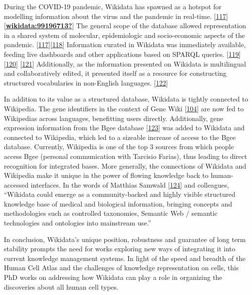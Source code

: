 During the COVID-19 pandemic, Wikidata has spawned as a hotspot for modelling information about the virus and the pandemic in real-time. {[}\protect\hyperlink{ref-zH3KDqhp}{117}{]} {[}\protect\hyperlink{ref-wikidata:99196713}{\textbf{wikidata:99196713?}}{]}
The general scope of the database allowed representation in a shared system of molecular, epidemiologic and socio-economic aspects of the pandemic. {[}\protect\hyperlink{ref-zH3KDqhp}{117}{]}{[}\protect\hyperlink{ref-mPoPwN77}{118}{]}
Information curated in Wikidata was immediately available, feeding live dashboards and other applications based on SPARQL queries. {[}\protect\hyperlink{ref-3YCzr3jU}{119}{]} {[}\protect\hyperlink{ref-SkOeuFRd}{120}{]} {[}\protect\hyperlink{ref-AOVCR8mW}{121}{]}
Additionally, as the information presented on Wikidata is multilingual and collaboratively edited, it presented itself as a resource for constructing structured vocabularies in non-English languages. {[}\protect\hyperlink{ref-19wiU1LCA}{122}{]}

In addition to its value as a structured database, Wikidata is tightly connected to Wikipedia.
The gene identifiers in the context of Gene Wiki {[}\protect\hyperlink{ref-2ZhxC0dg}{104}{]} are now fed to Wikipedias across languages, benefitting users directly.
Additionally, gene expression information from the Bgee database {[}\protect\hyperlink{ref-10EWNsZCz}{123}{]} was added to Wikidata and connected to Wikipedia, which led to a sizeable increase of access to the Bgee database.
Currently, Wikipedia is one of the top 3 sources from which people access Bgee (personal communication with Tarcisio Farias), thus leading to direct recognition for integrated bases.
More generally, the connections of Wikidata and Wikipedia make it unique in the power of flowing knowledge back to human-accessed interfaces.
In the words of Matthias Samwald {[}\protect\hyperlink{ref-864Pcm4C}{124}{]} and colleagues, ``Wikidata could emerge as a community-backed and highly visible structured knowledge base of medical and biological information, bringing concepts and methodologies such as controlled taxonomies, Semantic Web / semantic technologies and ontologies into mainstream use.''

In conclusion, Wikidata's unique position, robustness and guarantee of long term stability prompts the need for works exploring new ways of integrating it into current knowledge management systems.
In light of the speed and breadth of the Human Cell Atlas and the challenges of knowledge representation on cells, this PhD works on addressing how Wikidata can play a role in organizing the discoveries about all human cell types.

